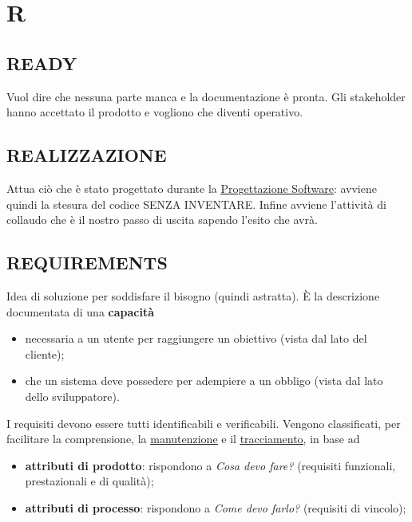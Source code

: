 \newpage
	\flushright{\hyperref[index]{\color{black!65}{Ritorna all'indice}}}\flushleft
	\section{R} \label{sec:R}
	
		\subsection{READY}		\label{ready}
		Vuol dire che nessuna parte manca e la documentazione è pronta. Gli stakeholder hanno accettato il prodotto e vogliono che diventi operativo.
	
		\subsection{REALIZZAZIONE} 	\label{realizzazione}
		Attua ciò che è stato progettato durante la \underline{\hyperref[progettazione]{Progettazione Software}}: avviene quindi la stesura del codice SENZA INVENTARE. Infine avviene l'attività di collaudo che è il nostro passo di uscita sapendo l'esito che avrà.
		
		\subsection{REQUIREMENTS}  \label{requirements}
		Idea di soluzione per soddisfare il bisogno (quindi astratta).
		È la descrizione documentata di una \textbf{capacità}
		\begin{itemize}
			\item necessaria a un utente per raggiungere un obiettivo (vista dal lato del cliente);
			\item che un sistema deve possedere per adempiere a un obbligo (vista dal lato dello sviluppatore). 
		\end{itemize}
	
	    I requisiti devono essere tutti identificabili e verificabili. Vengono classificati, per facilitare la comprensione, la \underline{\hyperref[manutenzione]{manutenzione}} e il \underline{\hyperref[tracciamento]{tracciamento}}, in base ad
	    	\begin{itemize}
	    		\item \textbf{attributi di prodotto}: rispondono a \textit{Cosa devo fare?} (requisiti funzionali, prestazionali e di qualità);
	    		\item \textbf{attributi di processo}: rispondono a \textit{Come devo farlo?} (requisiti di vincolo);
	    	\end{itemize}
	    
